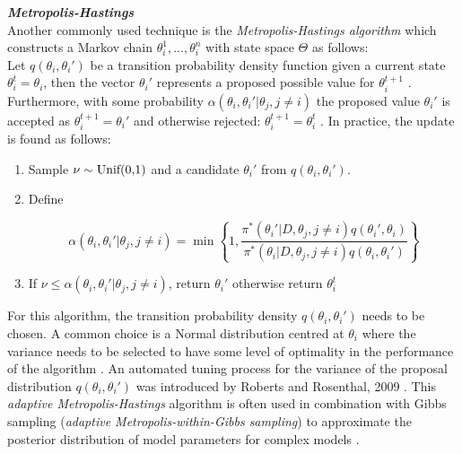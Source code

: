\textbf{\textit{Metropolis-Hastings}}\\

Another commonly used technique is the \emph{Metropolis-Hastings algorithm} \citep{Metropolis1953, Hastings1970} which constructs a Markov chain $\theta_i^1,...,\theta_i^n$ with state space $\Theta$ as follows:\\

Let $q(\theta_i,\theta_i')$ be a transition probability density function given a current state $\theta_i^t=\theta_i$, then the vector $\theta_i'$ represents a proposed possible value for $\theta_i^{t+1}$ \citep{Bernardo2000}. Furthermore, with some probability $\alpha(\theta_i,\theta_i'|\theta_j,j\neq{}i)$ the proposed value $\theta_i'$ is accepted as $\theta_i^{t+1}=\theta_i'$ and otherwise rejected: $\theta_i^{t+1}=\theta_i^t$ \cite{Roberts1994, Hastings1970}. In practice, the update is found as follows:

\begin{enumerate}
\item Sample $\nu\sim\textnormal{Unif(0,1)}$ and a candidate $\theta_i'$ from $q(\theta_i,\theta_i')$.
\item Define

\begin{equation}
\alpha(\theta_i,\theta_i'|\theta_j,j\neq{}i)=\min\left\lbrace{}1,\frac{\pi^*(\theta_i'|D,\theta_j,j\neq{}i)q(\theta_i',\theta_i)}{\pi^*(\theta_i|D,\theta_j,j\neq{}i)q(\theta_i,\theta_i')}\right\rbrace
\end{equation}

\item If $\nu\leq{}\alpha(\theta_i,\theta_i'|\theta_j,j\neq{}i)$, return $\theta_i'$ otherwise return $\theta_i^t$
\end{enumerate}

For this algorithm, the transition probability density $q(\theta_i,\theta_i')$ needs to be chosen. A common choice is a Normal distribution centred at $\theta_i$ where the variance needs to be selected to have some level of optimality in the performance of the algorithm \citep{Roberts2001}. An automated tuning process for the variance of the proposal distribution $q(\theta_i,\theta_i')$ was introduced by Roberts and Rosenthal, 2009 \citep{Roberts2009}. This \emph{adaptive Metropolis-Hastings} algorithm is often used in combination with Gibbs sampling (\emph{adaptive Metropolis-within-Gibbs sampling}) to approximate the posterior distribution of model parameters for complex models \citep{Roberts2009}.\\

